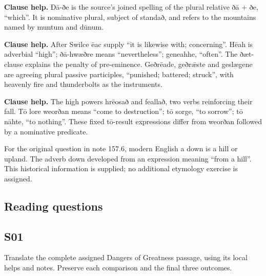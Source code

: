 \textbf{Clause help.} Ðā-ðe is the source’s joined spelling of the plural relative ðā + ðe, “which”. It is nominative plural, subject of standað, and refers to the mountains named by muntum and dūnum.

\textbf{Clause help.} After Swilce ēac supply “it is likewise with; concerning”. Hēah is adverbial “high”; ðā-hwæðre means “nevertheless”; geneahhe, “often”. The ðæt-clause explains the penalty of pre-eminence. Geðrēade, geðrǣste and geslægene are agreeing plural passive participles, “punished; battered; struck”, with heavenly fire and thunderbolts as the instruments.

\textbf{Clause help.} The high powers hrēosað and feallað, two verbs reinforcing their fall. Tō lore weorðan means “come to destruction”; tō sorge, “to sorrow”; tō nāhte, “to nothing”. These fixed tō-result expressions differ from weorðan followed by a nominative predicate.

For the original question in note 157.6, modern English a down is a hill or upland. The adverb down developed from an expression meaning “from a hill”. This historical information is supplied; no additional etymology exercise is assigned.

\subsection*{Reading questions}

\par\begin{minipage}{\linewidth}\raggedright
\subsection*{S01}

Translate the complete assigned Dangers of Greatness passage, using its local helps and notes. Preserve each comparison and the final three outcomes.

\end{minipage}\par\addvspace{4pt}

